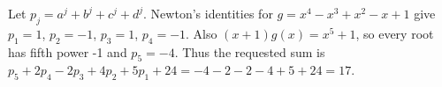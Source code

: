 Let $p_j=a^j+b^j+c^j+d^j$. Newton's identities for $g=x^4-x^3+x^2-x+1$ give $p_1=1$, $p_2=-1$, $p_3=1$, $p_4=-1$. Also $(x+1)g(x)=x^5+1$, so every root has fifth power -1 and $p_5=-4$. Thus the requested sum is $p_5+2p_4-2p_3+4p_2+5p_1+24=-4-2-2-4+5+24=\boxed{17}$.
